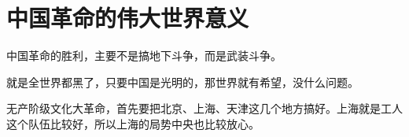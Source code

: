 \section[中国革命的伟大世界意义（一九六七年六月）]{中国革命的伟大世界意义}


中国革命的胜利，主要不是搞地下斗争，而是武装斗争。

就是全世界都黑了，只要中国是光明的，那世界就有希望，没什么问题。

无产阶级文化大革命，首先要把北京、上海、天津这几个地方搞好。上海就是工人这个队伍比较好，所以上海的局势中央也比较放心。


